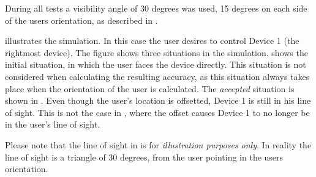 During all tests a visibility angle of \num{30} degrees was used, 
\ie \num{15} degrees on each side of the users orientation, 
as described in .

 illustrates the simulation. 
In this case the user desires to control Device 1 (the rightmost device). 
The figure shows three situations in the simulation. 
 shows the initial situation, 
in which the user faces the device directly. 
This situation is not considered when calculating the resulting accuracy, 
as this situation always takes place when the orientation of the user is calculated. 
The \emph{accepted} situation is shown in . 
Even though the user's location is offsetted, 
Device 1 is still in his line of sight. 
This is not the case in , 
where the offset causes Device 1 to no longer be in the user's line of sight.

Please note that the line of sight in  is for \emph{illustration purposes only}. 
In reality the line of sight is a triangle of \num{30} degrees, 
from the user pointing in the users orientation.

